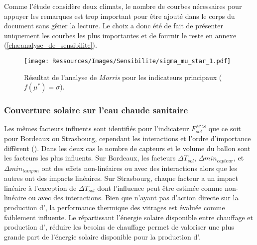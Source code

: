 Comme l’étude considère deux climats, le nombre de courbes nécessaires pour appuyer
les remarques est trop important pour être ajouté dans le corps du document sans gêner
la lecture. Le choix a donc été de fait de présenter uniquement les courbes les plus
importantes et de fournir le reste en annexe (\ref{cha:analyse_de_sensibilite}).

\begin{figure}
    \centering
    \texttt{[image: Ressources/Images/Sensibilite/sigma\_mu\_star\_1.pdf]}
    \caption[Résultat de l’analyse de \textit{Morris} pour les indicateurs principaux]
            {Résultat de l’analyse de \textit{Morris} pour les indicateurs principaux
             ($f(\mu^{*}) = \sigma$).}
    \label{fig:objectifs_mu_star}
\end{figure}


\subsubsection{Couverture solaire sur l’eau chaude sanitaire} %
\label{ssub:couverture_solaire_sur_l_ECS}
Les mêmes facteurs influents sont identifiés pour l’indicateur $F_{sol}^{ECS}$ que ce soit
pour Bordeaux ou Strasbourg, cependant les interactions et l’ordre d’importance diffèrent
(). Dans les deux cas le nombre de capteurs  et le
volume du ballon  sont les facteurs les plus influents. Sur Bordeaux, les
facteurs $\Delta T_{sol}$, $\Delta min_{capteur}$, et $\Delta min_{tampon}$ ont des effets
non-linéaires ou avec des interactions alors que les autres ont des impacts linéaires. Sur
Strasbourg, chaque facteur a un impact linéaire à l’exception de $\Delta T_{sol}$ dont
l’influence peut être estimée comme non-linéaire ou avec des interactions. Bien que
n’ayant pas d’action directe sur la production d’, la performance thermique des
vitrages est évaluée comme faiblement influente. Le  répartissant l’énergie
solaire disponible entre chauffage et production d’, réduire les besoins de
chauffage permet de valoriser une plus grande part de l’énergie solaire disponible pour la
production d’.


